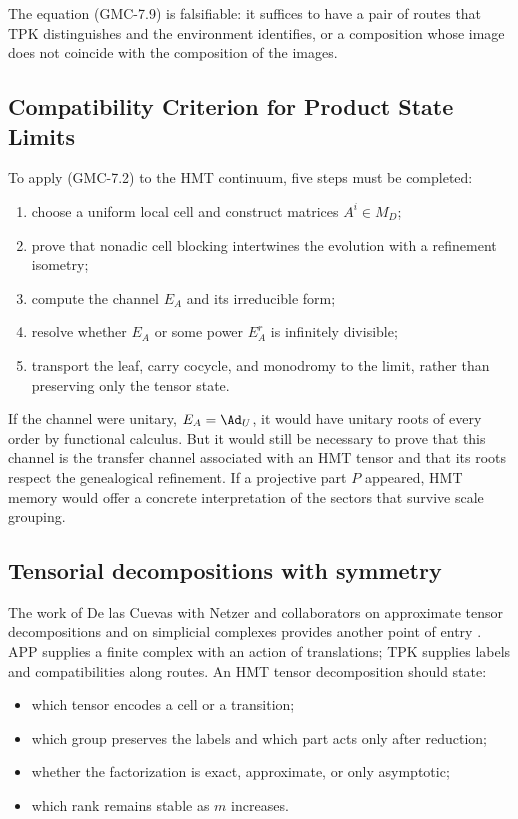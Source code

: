 The equation \textup{(GMC-7.9)} is falsifiable: it suffices to have a pair of routes that TPK
distinguishes and the environment identifies, or a composition whose image does not coincide
with the composition of the images.

\subsection{Compatibility Criterion for Product State Limits}

To apply \textup{(GMC-7.2)} to the HMT continuum, five steps must be completed:

\begin{enumerate}
 \item choose a uniform local cell and construct matrices
 $A^i\in M_D$;
 \item prove that nonadic cell blocking intertwines the evolution
 with a refinement isometry;
 \item compute the channel $E_A$ and its irreducible form;
 \item resolve whether $E_A$ or some power $E_A^r$ is infinitely
divisible;
 \item transport the leaf, carry cocycle, and
 monodromy to the limit, rather than preserving only the tensor state.
\end{enumerate}

If the channel were unitary, $E_A=\Ad_U$, it would have unitary roots of every
order by functional calculus. But it would still be necessary to prove that this channel is
the transfer channel associated with an HMT tensor and that its roots respect the
genealogical refinement. If a projective part $P$ appeared, HMT memory would offer
a concrete interpretation of the sectors that survive scale grouping.

\subsection{Tensorial decompositions with symmetry}

The work of De las Cuevas with Netzer and collaborators on
approximate tensor decompositions and on simplicial complexes
provides another point of entry \citep{delascuevas2021approximate,
delascuevas2024simplicial}. APP supplies a finite complex with an action of
translations; TPK supplies labels and compatibilities along routes. An
HMT tensor decomposition should state:

\begin{itemize}
 \item which tensor encodes a cell or a transition;
 \item which group preserves the labels and which part acts only after
 reduction;
 \item whether the factorization is exact, approximate, or only asymptotic;
 \item which rank remains stable as $m$ increases.
\end{itemize}


